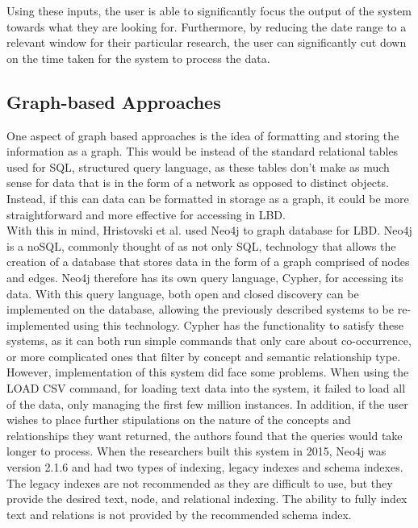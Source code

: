\documentclass{l4proj}
\begin{document}
Using these inputs, the user is able to significantly focus the output of the system towards what they are looking for. Furthermore, by reducing the date range to a relevant window for their particular research, the user can significantly cut down on the time taken for the system to process the data. \\

\subsection{Graph-based Approaches}

One aspect of graph based approaches is the idea of formatting and storing the information as a graph. This would be instead of the standard relational tables used for SQL, structured query language, as these tables don't make as much sense for data that is in the form of a network as opposed to distinct objects. Instead, if this can data can be formatted in storage as a graph, it could be more straightforward and more effective for accessing in LBD. \\

With this in mind, Hristovski et al. used Neo4j to graph database for LBD. Neo4j is a noSQL, commonly thought of as not only SQL, technology that allows the creation of a database that stores data in the form of a graph comprised of nodes and edges. Neo4j therefore has its own query language, Cypher, for accessing its data. With this query language, both open and closed discovery can be implemented on the database, allowing the previously described systems to be re-implemented using this technology. Cypher has the functionality to satisfy these systems, as it can both run simple commands that only care about co-occurrence, or more complicated ones that filter by concept and semantic relationship type. \\

However, implementation of this system did face some problems. When using the LOAD CSV command, for loading text data into the system, it failed to load all of the data, only managing the first few million instances. In addition, if the user wishes to place further stipulations on the nature of the concepts and relationships they want returned, the authors found that the queries would take longer to process. When the researchers built this system in 2015, Neo4j was version 2.1.6 and had two types of indexing, legacy indexes and schema indexes. The legacy indexes are not recommended as they are difficult to use, but they provide the desired text, node, and relational indexing. The ability to fully index text and relations is not provided by the recommended schema index. \\
\end{document}
